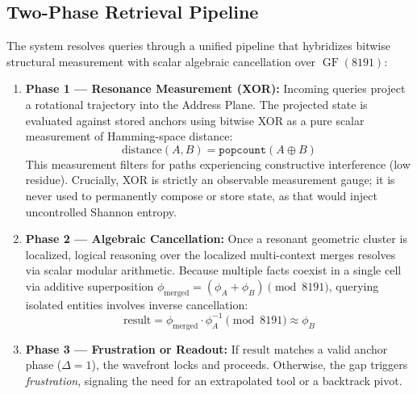 \subsection{Two-Phase Retrieval Pipeline}
\label{sec:hybrid_pipeline}

The system resolves queries through a unified pipeline that hybridizes bitwise structural measurement with scalar algebraic cancellation over $\operatorname{GF}(8191)$:

\begin{enumerate}[nosep]
  \item \textbf{Phase 1 --- Resonance Measurement (XOR):}
        Incoming queries project a rotational trajectory into the Address Plane. The projected state is evaluated against stored anchors using bitwise XOR as a pure scalar measurement of Hamming-space distance:
        \begin{equation}
          \text{distance}(A, B) = \texttt{popcount}(A \oplus B)
          \label{eq:xor_distance}
        \end{equation}
        This measurement filters for paths experiencing constructive interference (low residue). Crucially, XOR is strictly an observable measurement gauge; it is never used to permanently compose or store state, as that would inject uncontrolled Shannon entropy.

  \item \textbf{Phase 2 --- Algebraic Cancellation:}
        Once a resonant geometric cluster is localized, logical reasoning over the localized multi-context merges resolves via scalar modular arithmetic. Because multiple facts coexist in a single cell via additive superposition $\phi_{\text{merged}} = (\phi_A + \phi_B) \pmod{8191}$, querying isolated entities involves inverse cancellation:
        \begin{equation}
          \text{result} = \phi_{\text{merged}} \cdot \phi_A^{-1} \pmod{8191} \approx \phi_B
          \label{eq:modular_inverse}
        \end{equation}
  \item \textbf{Phase 3 --- Frustration or Readout:}
        If $\text{result}$ matches a valid anchor phase ($\Delta = 1$), the wavefront locks and proceeds. Otherwise, the gap triggers \emph{frustration}, signaling the need for an extrapolated tool or a backtrack pivot.
\end{enumerate}

